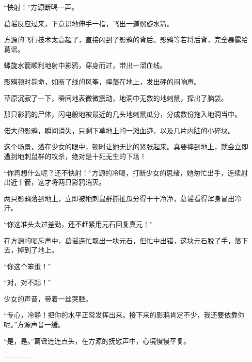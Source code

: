 \begin{this_body}
“快射！”方源断喝一声。

葛谣反应过来，下意识地伸手一指，飞出一道螺旋水箭。

方源的飞行技术太高超了，直接闪到了影鸦的背后。影鸦等若将后背，完全暴露给葛谣。

螺旋水箭顺利地射中影鸦，穿身而过，带出一溜血线。

影鸦顿时毙命，如断了线的风筝，摔落在地上，发出砰的闷响声。

草原沉寂了一下，瞬间地表微微震动，地洞中无数的地刺鼠，探出了脑袋。

那只影鸦的尸体，闪电般地被最近的几头地刺鼠瓜分，分成数份拖入地洞当中。

偌大的影鸦，瞬间消失，只剩下草地上的一滩血迹，以及几片内脏的小碎块。

这个场景，落在少女的眼中，顿时让她无比的紧张起来。真要摔到地上，就会立即遭到地刺鼠群的攻杀，绝对是十死无生的下场！

“你再想什么呢？还不快射！”方源的冷喝，打断少女的思绪，她匆忙出手，连续射出近十箭，这才将两只影鸦消灭。

两只影鸦落到地上，立即被地刺鼠群撕扯瓜分得干干净净，葛谣看得浑身冒出冷汗。

“你这准头太过差劲，还不赶紧用元石回复真元！”

在方源的喝斥声中，葛谣连忙取出一块元石，但忙中出错，这块元石脱了手，落下去，掉到了地上。

“你这个笨蛋！”

“对，对不起！”

少女的声音，带着一丝哭腔。

“专心，冷静！把你的水平正常发挥出来。接下来的影鸦肯定不少，我还要依靠你呢。”方源声音一缓。

“是，是。”葛谣连连点头，在方源的抚慰声中，心境慢慢平复。

------------

\end{this_body}

